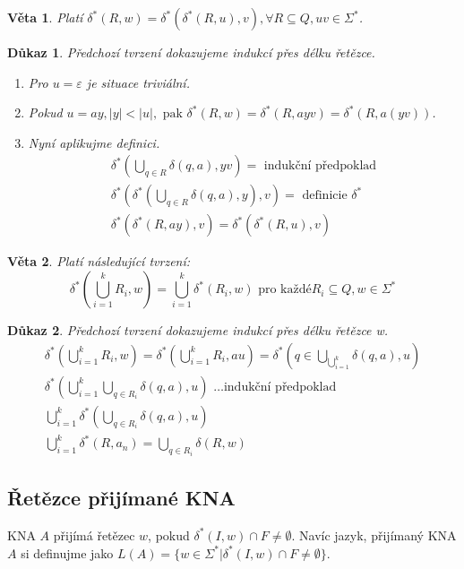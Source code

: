 \documentclass[10pt, a4paper, titlepage]{article}
\theoremstyle{note}
\newtheorem{dukaz}{Důkaz}
\newtheorem{veta}{Věta}
\begin{document}
\begin{veta}
Platí $\delta^{*}(R,w) = \delta^{*}(\delta^{*}(R,u),v), \forall R \subseteq Q, uv \in \Sigma^{*}$.
\end{veta}
\begin{dukaz}
Předchozí tvrzení dokazujeme indukcí přes délku řetězce.

\begin{enumerate}
\item
Pro $u = \varepsilon$ je situace triviální.

\item
Pokud $u = ay, |y| < |u|,\text{ pak } \delta^{*}(R,w) = \delta^{*}(R,ayv) = \delta^{*}(R,a(yv))$.

\item
Nyní aplikujme definici.
\begin{gather*}
\delta^{*}(\bigcup\limits_{q \in R} \delta(q, a), yv) = \text{ indukční předpoklad} \\
\delta^{*}(\delta^{*}(\bigcup\limits_{q \in R} \delta(q, a), y), v) = \text{ definicie } \delta^{*} \\
\delta^{*}(\delta^{*}(R, ay), v) = \delta^{*}(\delta^{*}(R,u),v)
\end{gather*}
\end{enumerate}
\end{dukaz}

\begin{veta}
Platí následující tvrzení:
$$
\delta^{*}(\bigcup\limits_{i=1}^{k} R_{i},w) = \bigcup\limits_{i=1}^{k} \delta^{*}(R_{i},w) \text{ pro každé} R_{i} \subseteq Q, w \in \Sigma^{*}
$$
\end{veta}
\begin{dukaz}
Předchozí tvrzení dokazujeme indukcí přes délku řetězce w.
\begin{gather*}
\delta^{*}(\bigcup\limits_{i=1}^{k}R_{i},w) = \delta^{*}(\bigcup\limits_{i=1}^{k}R_{i},au) = \delta^{*}(q \in \bigcup\limits_{\bigcup_{i=1}^{k}} \delta(q, a), u) \\
\delta^{*}(\bigcup\limits_{i=1}^{k}\bigcup\limits_{q \in R_{i}} \delta(q,a),u) \text{ \ldots indukční předpoklad} \\
\bigcup\limits_{i=1}^{k} \delta^{*}(\bigcup\limits_{q \in R_{i}} \delta(q,a),u) \\
\bigcup\limits_{i=1}^{k} \delta^{*}(R,a_{n}) = \bigcup\limits_{q \in R_{i}} \delta(R,w)
\end{gather*}
\end{dukaz}

\subsection{Řetězce přijímané KNA}
KNA $A$ přijímá řetězec $w$, pokud $\delta^{*}(I,w) \cap F \neq \emptyset$.
Navíc jazyk, přijímaný KNA $A$ si definujme jako $L(A) = \lbrace w \in \Sigma^{*} | \delta^{*}(I,w) \cap F \neq \emptyset \rbrace$.
\end{document}
